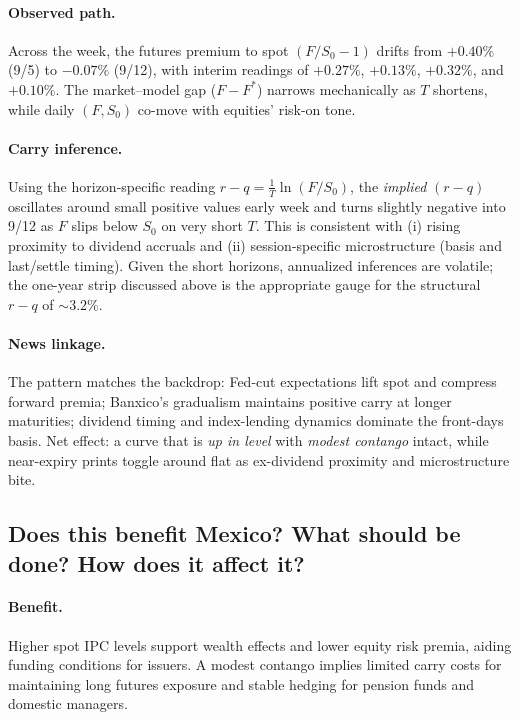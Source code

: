 \documentclass[11pt,a4paper]{article} %
\begin{document}
\paragraph{Observed path.}
Across the week, the futures premium to spot \((F/S_0-1)\) drifts from \(\mathbf{+0.40\%}\) (9/5) to \(\mathbf{-0.07\%}\) (9/12), with interim readings of \(+0.27\%\), \(+0.13\%\), \(+0.32\%\), and \(+0.10\%\). The market–model gap (\(F-F^{*}\)) narrows mechanically as \(T\) shortens, while daily \((F,S_0)\) co-move with equities’ risk-on tone.

\paragraph{Carry inference.}
Using the horizon-specific reading \(r-q=\frac{1}{T}\ln(F/S_0)\), the \emph{implied} \((r-q)\) oscillates around small positive values early week and turns slightly negative into 9/12 as \(F\) slips below \(S_0\) on very short \(T\). This is consistent with (i) rising proximity to dividend accruals and (ii) session-specific microstructure (basis and last/settle timing). Given the short horizons, annualized inferences are volatile; the one-year strip discussed above is the appropriate gauge for the structural \(r-q\) of \(\sim 3.2\%\).

\paragraph{News linkage.}
The pattern matches the backdrop: Fed-cut expectations lift spot and compress forward premia; Banxico’s gradualism maintains positive carry at longer maturities; dividend timing and index-lending dynamics dominate the front-days basis. Net effect: a curve that is \emph{up in level} with \emph{modest contango} intact, while near-expiry prints toggle around flat as ex-dividend proximity and microstructure bite.

\subsection{Does this benefit Mexico? What should be done? How does it affect it?}
\paragraph{Benefit.}
Higher spot IPC levels support wealth effects and lower equity risk premia, aiding funding conditions for issuers. A modest contango implies limited carry costs for maintaining long futures exposure and stable hedging for pension funds and domestic managers.
\end{document}
